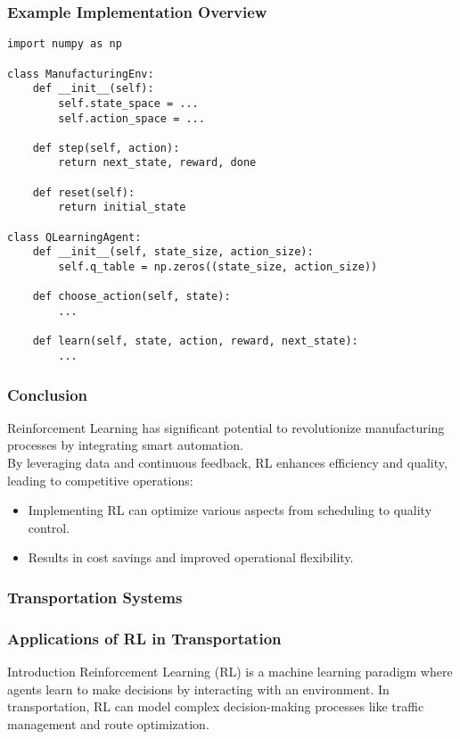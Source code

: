 \documentclass[aspectratio=169]{beamer}
\begin{document}
\begin{frame}[fragile]
    \frametitle{Example Implementation Overview}
    \begin{lstlisting}
import numpy as np

class ManufacturingEnv:
    def __init__(self):
        self.state_space = ...
        self.action_space = ...

    def step(self, action):
        return next_state, reward, done

    def reset(self):
        return initial_state

class QLearningAgent:
    def __init__(self, state_size, action_size):
        self.q_table = np.zeros((state_size, action_size))

    def choose_action(self, state):
        ...

    def learn(self, state, action, reward, next_state):
        ...
    \end{lstlisting}
\end{frame}

\begin{frame}
    \frametitle{Conclusion}
    Reinforcement Learning has significant potential to revolutionize manufacturing processes by integrating smart automation.\\[5pt]
    By leveraging data and continuous feedback, RL enhances efficiency and quality, leading to competitive operations:
    \begin{itemize}
        \item Implementing RL can optimize various aspects from scheduling to quality control.
        \item Results in cost savings and improved operational flexibility.
    \end{itemize}
\end{frame}

\begin{frame}[fragile]
  \frametitle{Transportation Systems}
\end{frame}

\begin{frame}[fragile]
  \frametitle{Applications of RL in Transportation}
  \begin{block}{Introduction}
    Reinforcement Learning (RL) is a machine learning paradigm where agents learn to make decisions by interacting with an environment. In transportation, RL can model complex decision-making processes like traffic management and route optimization.
  \end{block}
\end{frame}
\end{document}
